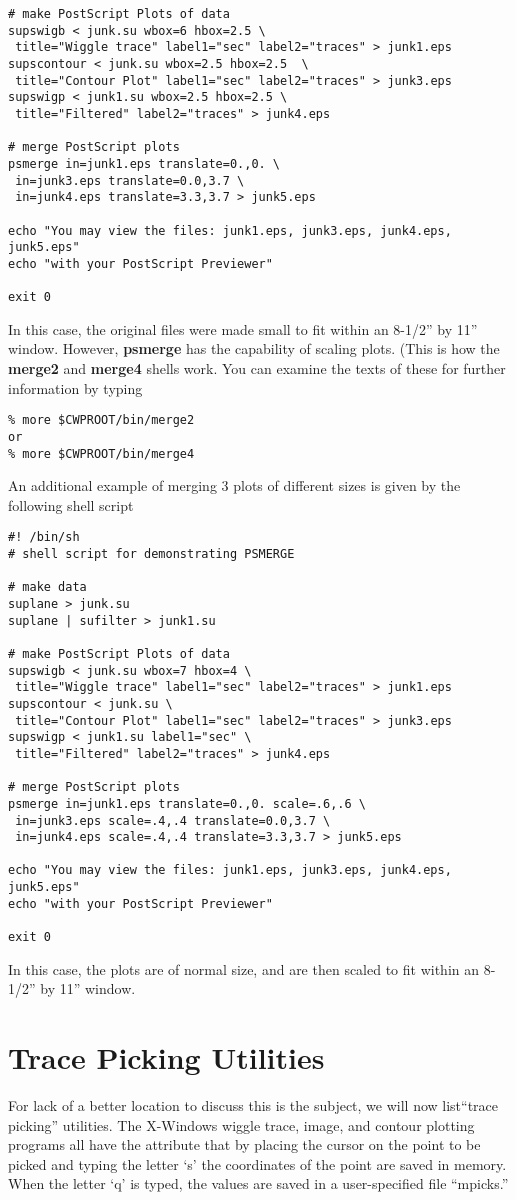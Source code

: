 {{{{{{{{\begin{verbatim}
# make PostScript Plots of data
supswigb < junk.su wbox=6 hbox=2.5 \
 title="Wiggle trace" label1="sec" label2="traces" > junk1.eps
supscontour < junk.su wbox=2.5 hbox=2.5  \
 title="Contour Plot" label1="sec" label2="traces" > junk3.eps
supswigp < junk1.su wbox=2.5 hbox=2.5 \
 title="Filtered" label2="traces" > junk4.eps

# merge PostScript plots
psmerge in=junk1.eps translate=0.,0. \
 in=junk3.eps translate=0.0,3.7 \
 in=junk4.eps translate=3.3,3.7 > junk5.eps

echo "You may view the files: junk1.eps, junk3.eps, junk4.eps, junk5.eps"
echo "with your PostScript Previewer"

exit 0
\end{verbatim}}\noindent
In this case, the original files were made small to fit within an
8-1/2'' by 11'' window.
However, {\bf psmerge\/} has the capability of scaling plots.
(This is how the {\bf merge2\/} and {\bf merge4\/} shells work.
You can examine the texts of these for further information by typing
{\small\begin{verbatim}
% more $CWPROOT/bin/merge2
or
% more $CWPROOT/bin/merge4
\end{verbatim}}\noindent
An additional example of merging 3 plots of different sizes is given
by the following shell script
{\small\begin{verbatim}
#! /bin/sh
# shell script for demonstrating PSMERGE

# make data
suplane > junk.su
suplane | sufilter > junk1.su

# make PostScript Plots of data
supswigb < junk.su wbox=7 hbox=4 \
 title="Wiggle trace" label1="sec" label2="traces" > junk1.eps
supscontour < junk.su \
 title="Contour Plot" label1="sec" label2="traces" > junk3.eps
supswigp < junk1.su label1="sec" \
 title="Filtered" label2="traces" > junk4.eps

# merge PostScript plots
psmerge in=junk1.eps translate=0.,0. scale=.6,.6 \
 in=junk3.eps scale=.4,.4 translate=0.0,3.7 \
 in=junk4.eps scale=.4,.4 translate=3.3,3.7 > junk5.eps

echo "You may view the files: junk1.eps, junk3.eps, junk4.eps, junk5.eps"
echo "with your PostScript Previewer"

exit 0
\end{verbatim}}\noindent

In this case, the plots are of normal size, and are then scaled to
fit within an 8-1/2'' by 11'' window.

\section{Trace Picking Utilities}
For lack of a better location to discuss this is the subject,
we will now list``trace picking'' utilities.
The X-Windows wiggle trace, image, and contour plotting programs
all have the attribute that by placing the cursor on the point to
be picked and typing the letter `s' the coordinates of the point
are saved in memory. When the letter `q' is typed, the values
are saved in a user-specified file ``mpicks.''

}}}}}}}
